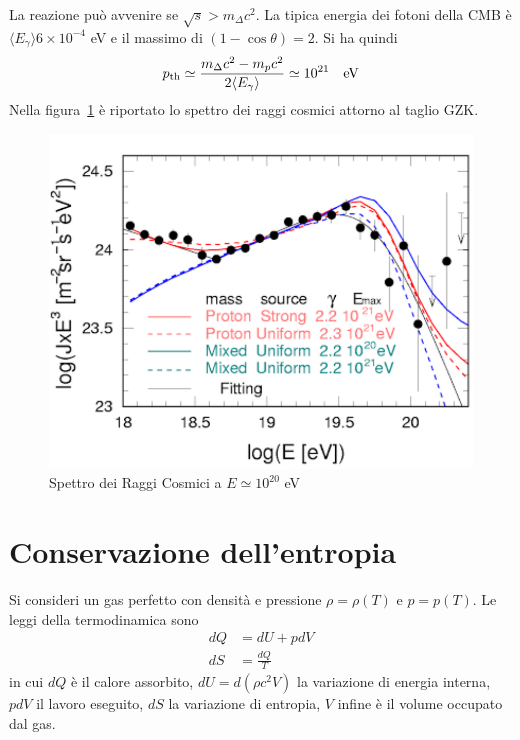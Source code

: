 La reazione può avvenire se $\sqrt{s} > m_{\Delta} c^2$.  La tipica energia dei
fotoni della CMB è $\langle E_{\gamma}\rangle 6 \times 10^{-4}$ eV e il massimo
di $(1-\cos \theta)=2$.  Si ha quindi
\begin{equation}
  p_{\textup{th}} \simeq \frac{m_{\Delta} c^2 - m_p c^2}{2 \langle
    E_{\gamma}\rangle} \simeq 10^{21}~~~{\rm eV}
\end{equation}
Nella figura~\ref{fig:CR2} è riportato lo spettro dei raggi cosmici attorno al
taglio GZK.
\begin{figure}
  \centering{}
  \includegraphics[width=\textwidth]{figure/CR_spectrum_2.pdf}
  \caption{Spettro dei Raggi Cosmici a $E \simeq 10^{20}$ eV}
  \label{fig:CR2}
\end{figure}

\section{Conservazione dell'entropia}

Si consideri un gas perfetto con densità e pressione $\rho= \rho(T)$ e $p=p(T)$.
Le leggi della termodinamica sono
\begin{subequations}
  \label{leggi_termo}
  \begin{align}
    dQ &= dU+pdV \\
    dS &= \frac{dQ}{T}
  \end{align}
\end{subequations}
in cui $dQ$ è il calore assorbito, $dU=d(\rho c^2 V)$ la variazione di energia
interna, $pdV$ il lavoro eseguito, $dS$ la variazione di entropia, $V$ infine è
il volume occupato dal gas.

